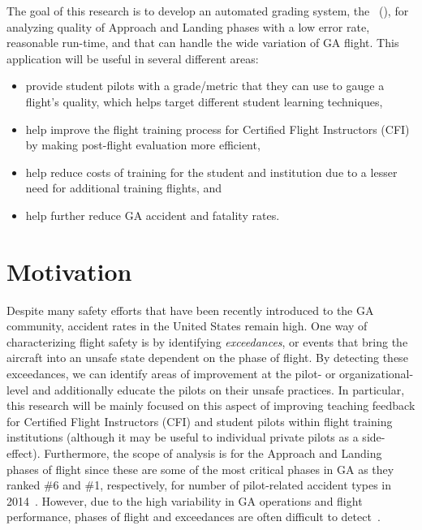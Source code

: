 	The goal of this research is to develop an automated grading system, the \toolname\ (\toolnameshort), for analyzing quality of Approach and Landing phases with a low error rate, reasonable run-time, and that can handle the wide variation of GA flight.  This application will be useful in several different areas:
%
    \begin{itemize}
    	\item provide student pilots with a grade/metric that they can use to gauge a flight's quality, which helps target different student learning techniques,
        \item help improve the flight training process for Certified Flight Instructors (CFI) by making post-flight evaluation more efficient,
        \item help reduce costs of training for the student and institution due to a lesser need for additional training flights, and
        \item help further reduce GA accident and fatality rates.
    \end{itemize}
    

\section{Motivation} \label{sec:motivation}

	Despite many safety efforts that have been recently introduced to the GA community, accident rates in the United States remain high.  One way of characterizing flight safety is by identifying \textit{exceedances}, or events that bring the aircraft into an unsafe state dependent on the phase of flight.  By detecting these exceedances, we can identify areas of improvement at the pilot- or organizational-level and additionally educate the pilots on their unsafe practices.  In particular, this research will be mainly focused on this aspect of improving teaching feedback for Certified Flight Instructors (CFI) and student pilots within flight training institutions (although it may be useful to individual private pilots as a side-effect).  Furthermore, the scope of analysis is for the Approach and Landing phases of flight since these are some of the most critical phases in GA as they ranked \#6 and \#1, respectively, for number of pilot-related accident types in 2014~\cite{kenny201726th}.  However, due to the high variability in GA operations and flight performance, phases of flight and exceedances are often difficult to detect~\cite{goblet2015identifying,goblet2016phase,fala2016detecting}.
    
